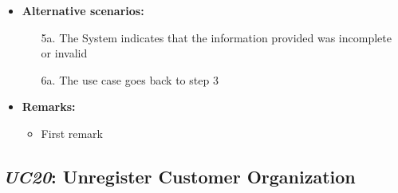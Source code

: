 \documentclass[a4paper,10pt]{article}
\begin{document}
\begin{itemize}
	\item \textbf{Alternative scenarios:} 
	\begin{enumerate}
		\item [5a.] The System indicates that the information provided was incomplete or invalid
		\item [6a.] The use case goes back to step 3
	\end{enumerate}
	
	\item \textbf{Remarks:}
	\begin{itemize}
		\item First remark
	\end{itemize}
\end{itemize}

\subsection{\emph{UC20}: Unregister Customer Organization}
\end{document}
